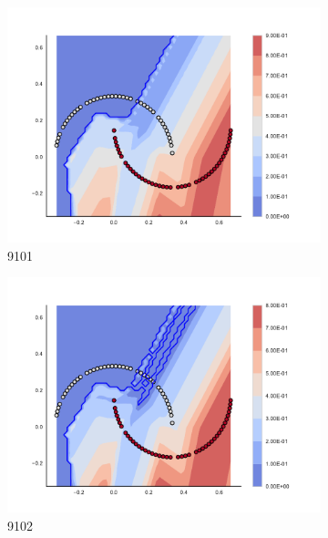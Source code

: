 \begin{figure}[h]
\begin{subfigure}[b]{0.09\textwidth}
    \includegraphics[clip, trim=2.35cm 1.75cm 4.5cm 0cm,width=\textwidth]{img/convergence/9101.pdf}
    \caption{9101}
    \label{fig:convergence_9101}
\end{subfigure}
%
\begin{subfigure}[b]{0.09\textwidth}
    \includegraphics[clip, trim=2.35cm 1.75cm 4.5cm 0cm,width=\textwidth]{img/convergence/9102.pdf}
    \caption{9102}
    \label{fig:convergence_9102}
\end{subfigure}
%
\begin{subfigure}[b]{0.09\textwidth}

\end{subfigure}
\end{figure}
